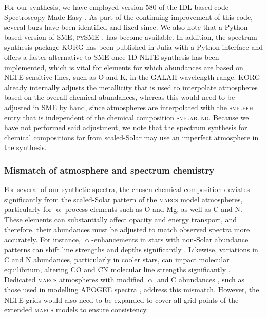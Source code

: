 \documentclass[
  journal=pasa,
  manuscript=research-paper, %
  year=2024,
  volume=37
]{cup-journal}
\newcommand{\marcs}{\textsc{marcs}\xspace}
\begin{document}
For our synthesis, we have employed version 580 of the IDL-based code Spectroscopy Made Easy \citep{Valenti1996, Piskunov2017}. As part of the continuing improvement of this code, several bugs have been identified and fixed since. We also note that a Python-based version of \textsc{SME}, \textsc{pySME} \citep{Wehrhahn2023}, has become available. In addition, the spectrum synthesis package \textsc{KORG} \citep{Wheeler2023, Wheeler2024} has been published in Julia with a Python interface and offers a faster alternative to \textsc{SME} once 1D NLTE synthesis has been implemented, which is vital for elements for which abundances are based on NLTE-sensitive lines, such as O and K, in the GALAH wavelength range. \textsc{KORG} already internally adjusts the metallicity that is used to interpolate atmospheres based on the overall chemical abundances, whereas this would need to be adjusted in \textsc{SME} by hand, since atmospheres are interpolated with the \textsc{sme.feh} entry that is independent of the chemical composition \textsc{sme.abund}. Because we have not performed said adjustment, we note that the spectrum synthesis for chemical compositions far from scaled-Solar may use an imperfect atmosphere in the synthesis.

\subsubsection{Mismatch of atmosphere and spectrum chemistry}

For several of our synthetic spectra, the chosen chemical composition deviates significantly from the scaled-Solar pattern of the \marcs model atmospheres, particularly for $\upalpha$-process elements such as O and Mg, as well as C and N. These elements can substantially affect opacity and energy transport, and therefore, their abundances must be adjusted to match observed spectra more accurately. For instance, $\upalpha$-enhancements in stars with non-Solar abundance patterns can shift line strengths and depths significantly \citep{VandenBerg2012, Asplund2005}. Likewise, variations in C and N abundances, particularly in cooler stars, can impact molecular equilibrium, altering CO and CN molecular line strengths significantly \citep{Tsuji1976, Smith2013}. Dedicated \marcs atmospheres with modified $\upalpha$ and C abundances \citep{Joensson2020}, such as those used in modelling APOGEE spectra \citep{SDSSDR17}, address this mismatch. However, the NLTE grids would also need to be expanded to cover all grid points of the extended \marcs models to ensure consistency.
\end{document}
